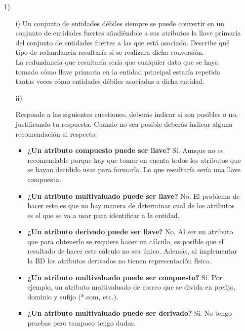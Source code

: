 \documentclass[a4paper, 12pt]{report}
\begin{document}
\begin{enumerate}
\item[1)]
	\begin{enumerate}
    	\item[i)]{Un conjunto de entidades débiles siempre se puede convertir en un
        conjunto de entidades fuertes añadiéndole a sus atributos la llave
        primaria del conjunto de entidades fuertes a las que está asociado.
        Describe qué tipo de redundancia resultaría si se realizara dicha
        conversión.\\
        La redundancia que resultaría sería que cualquier dato que se haya
        tomado cómo llave primaria en la entidad principal estaría repetida
        tantas veces cómo entidades débiles asociadas a dicha entidad.
    }
    \item[ii)]{Responde a las siguientes cuestiones, deberás indicar si son
                posibles o no, justificando tu respuesta. Cuando no sea posible
                deberás indicar alguna recomendación al respecto:\\
        \begin{itemize}
        \item{\textbf{¿Un atributo compuesto puede ser llave?} Sí. Aunque no es
            recomendable porque hay que tomar en cuenta todos los atributos que
            se hayan decidido usar para formarla. Lo que resultaría sería una
            llave compuesta.
        }
        \item{\textbf{¿Un atributo multivaluado puede ser llave?} No. El
            problema de hacer esto es que no hay manera de determinar cual de
            los atributos es el que se va a usar para identificar a la entidad.
        }
        \item{\textbf{¿Un atributo derivado puede ser llave?} No. Al ser un
            atributo que para obtenerlo se requiere hacer un cálculo, es posible
            que el resultado de hacer este cálculo no sea único. Además, al
            implementar la BD los atributos derivados no tienen representación
            física.
        }
        \item{\textbf{¿Un atributo multivaluado puede ser compuesto?} Sí. Por
            ejemplo, un atributo multivaluado de correo que se divida en prefijo,
            dominio y sufijo (*.com, etc.).
        }
        \item{\textbf{¿Un atributo multivaluado puede ser derivado?} Sí. No
            tengo pruebas pero tampoco tengo dudas.\\
}
\end{itemize}}
\end{enumerate}
\end{enumerate}
\end{document}
